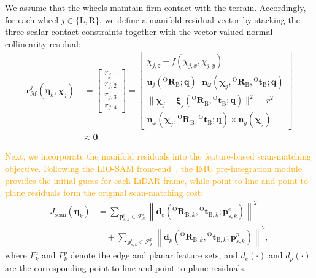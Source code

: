 \documentclass[journal,twoside,web]{ieeecolor}
\newcommand{\yzl}[1]{\textcolor{orange}{#1}}
\begin{document}
We assume that the wheels maintain firm contact with the terrain. Accordingly, for each wheel \(j\in\{\mathrm{L},\mathrm{R}\}\), we define a manifold residual vector by stacking the three scalar contact constraints together with the vector-valued normal-collinearity residual:
\begin{align}\label{eq:residual_manifold_left_wheel}
    \mathbf{r}_{\mathcal{M}}^{j}(\bm\eta_k, \bm{\chi}_j)
    \!&:=\!\!
    \begin{bmatrix}
        r_{j,1}\\[2pt]
        r_{j,2}\\[2pt]
        r_{j,3}\\[2pt]
        \mathbf{r}_{j,4}
    \end{bmatrix}
    \!\!=\!\!
    \begin{bmatrix}
        \chi_{j,z} - f(\chi_{j,x},\chi_{j,y})\\[2pt]
        \mathbf{u}_j({}^{\mathrm{O}}\mathbf{R}_\mathrm{B}; \mathbf{q})^\top
        \mathbf{n}_\omega(\bm{\chi}_j,\!\!{}^{\mathrm{O}}\mathbf{R}_\mathrm{B},\!\! {}^{\mathrm{O}}\mathbf{t}_{\mathrm{B}}; \mathbf{q})\\[2pt]
        \|\bm{\chi}_j - \bm\xi_j({}^{\mathrm{O}}\mathbf{R}_\mathrm{B}, {}^{\mathrm{O}}\mathbf{t}_{\mathrm{B}}; \mathbf{q})\|^2 - r^2\\[2pt]
        \mathbf{n}_\omega(\bm{\chi}_j,{}^{\mathrm{O}}\mathbf{R}_\mathrm{B}, {}^{\mathrm{O}}\mathbf{t}_{\mathrm{B}}; \mathbf{q})
        \times
        \mathbf{n}_g(\bm{\chi}_j)
    \end{bmatrix}\nonumber\\
    &\approx \mathbf{0}.
\end{align}

\yzl{Next, we incorporate the manifold residuals into the feature-based scan-matching objective. Following the LIO-SAM front-end~\cite{liosam}, the IMU pre-integration module provides the initial guess for each LiDAR frame, while point-to-line and point-to-plane residuals form the original scan-matching cost:}
\begin{equation}
\begin{aligned}
    J_{\mathrm{scan}}(\bm\eta_k)
    &=
    \sum_{\mathbf{p}^e_{s,k}\in\mathcal{F}^e_k}
    \left\|
    \mathbf{d}_e({}^{\mathrm{O}}\mathbf{R}_{\mathrm{B},k},{}^{\mathrm{O}}\mathbf{t}_{\mathrm{B},k};\mathbf{p}^e_{s,k})
    \right\|^2\\
    &\quad+
    \sum_{\mathbf{p}^p_{s,k}\in\mathcal{F}^p_k}
    \left\|
    \mathbf{d}_p({}^{\mathrm{O}}\mathbf{R}_{\mathrm{B},k},{}^{\mathrm{O}}\mathbf{t}_{\mathrm{B},k};\mathbf{p}^p_{s,k})
    \right\|^2,
\end{aligned}
\end{equation}
where $F^e_k$ and $F^p_k$ denote the edge and planar feature sets, and $d_e(\cdot)$ and $d_p(\cdot)$ are the corresponding point-to-line and point-to-plane residuals.
\end{document}
